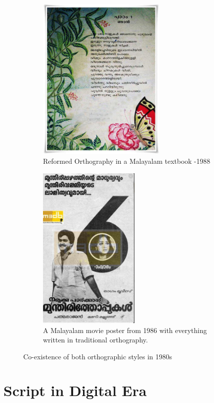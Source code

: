 \documentclass[10pt]{article}
\begin{document}
\begin{figure}[h!]
	\begin{subfigure}{.5\textwidth}
		\centering
		\includegraphics[width=\linewidth, height=8cm]{images/1988-reformed_text.jpg}
		\caption{Reformed Orthography in a Malayalam textbook -1988}
		\label{1988Text}
	\end{subfigure}
	\begin{subfigure}{.5\textwidth}
		\centering
		\includegraphics[width=\linewidth, height=8cm]{images/1986-Movieposter.png}
		\caption{A Malayalam movie poster from 1986 with everything written in traditional orthography.}
		\label{1986Movie}
	\end{subfigure}
	\caption{Co-existence of both orthographic styles in 1980s}
	\label{1986and1988}
\end{figure}

\section{Script in Digital Era}
\end{document}
